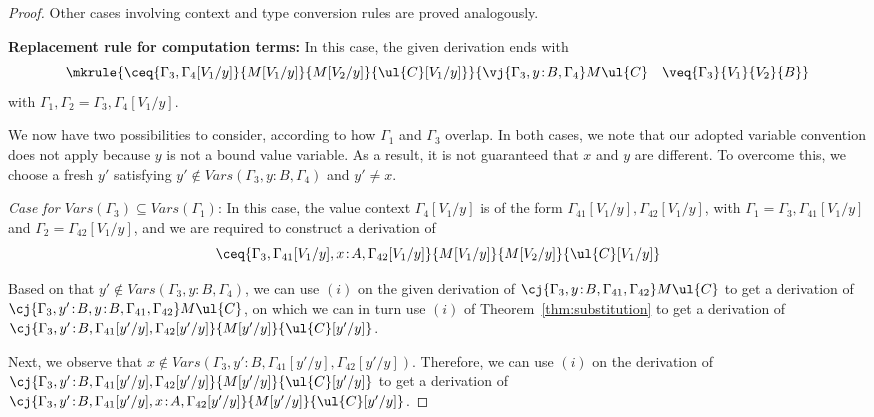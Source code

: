 \begin{proof}
Other cases involving context and type conversion rules are proved analogously.

\vspace{0.2cm}

\noindent \textbf{Replacement rule for computation terms:}
In this case, the given derivation ends with
\[
\mkrule
{\ceq {\Gamma_3, \Gamma_4[V_1/y]} {M[V_1/y]} {M[V_2/y]} {\ul{C}[V_1/y]}}
{\vj {\Gamma_3, y \!:\! B, \Gamma_4} M {\ul{C}} \quad \veq {\Gamma_3} {V_1} {V_2} {B}}
\]
with $\Gamma_1,\Gamma_2 = \Gamma_3, \Gamma_4[V_1/y]$. 

We now have two possibilities to consider, according to how $\Gamma_1$ and $\Gamma_3$ overlap. 
%
In both cases, we note that our adopted variable convention does not apply because $y$ is not a bound value variable. As a result, it is not guaranteed that $x$ and $y$ are different. To overcome this, we choose a fresh $y'$ satisfying $y' \not\in V\!ars(\Gamma_3, y \!:\! B, \Gamma_4)$ and $y' \neq x$.


\vspace{0.2cm}
\noindent
\emph{Case for $V\!ars(\Gamma_3) \subseteq V\!ars(\Gamma_1)$}: In this case, the value context $\Gamma_4[V_1/y]$ is of the form $\Gamma_{41}[V_1/y], \Gamma_{42}[V_1/y]$, with $\Gamma_1 = \Gamma_3,\Gamma_{41}[V_1/y]$ and $\Gamma_2 = \Gamma_{42}[V_1/y]$, and we are required to construct a derivation of
\[
\ceq {\Gamma_3, \Gamma_{41}[V_1/y], x \!:\! A, \Gamma_{42}[V_1/y]} {M[V_1/y]} {M[V_2/y]} {\ul{C}[V_1/y]}
\]

Based on that ${y' \not\in V\!ars(\Gamma_3, y \!:\! B, \Gamma_4)}$, we can use $(i)$ on the given derivation of \linebreak$\cj {\Gamma_3, y \!:\! B, \Gamma_{41}, \Gamma_{42}} M {\ul{C}}$ to get a derivation of $\cj {\Gamma_3, y' \!:\! B, y \!:\! B, \Gamma_{41}, \Gamma_{42}} M {\ul{C}}$, \linebreak on which we can in turn use $(i)$ of Theorem~\ref{thm:substitution} to get a derivation of \linebreak $\cj {\Gamma_{3}, y' \!:\! B, \Gamma_{41}[y'/y], \Gamma_{42}[y'/y]} {M[y'/y]} {\ul{C}[y'/y]}$.

Next, we observe that $x \not\in V\!ars(\Gamma_3, y' \!:\! B, \Gamma_{41}[y'/y], \Gamma_{42}[y'/y])$.
Therefore, we can use $(i)$ on the derivation of $\cj {\Gamma_3, y' \!:\! B, \Gamma_{41}[y'/y], \Gamma_{42}[y'/y]} {M[y'/y]} {\ul{C}[y'/y]}$ to get a derivation of $\cj {\Gamma_3, y' \!:\! B, \Gamma_{41}[y'/y], x \!:\! A, \Gamma_{42}[y'/y]} {M[y'/y]} {\ul{C}[y'/y]}$. 


\end{proof}
